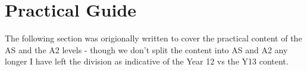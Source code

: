 \section{Practical Guide}

The following section was origionally written to cover the practical content of the AS and the A2 levels - though we don't split the content into AS and A2 any longer I have left the division as indicative of the Year 12 vs the Y13 content.


